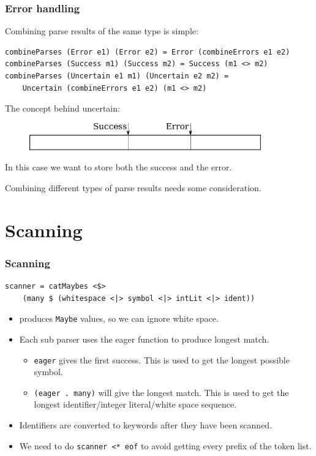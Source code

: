 \documentclass{beamer}
\begin{document}
\begin{frame}[fragile]

\frametitle{Error handling}

Combining parse results of the same type is simple:

\begin{lstlisting}
combineParses (Error e1) (Error e2) = Error (combineErrors e1 e2)
combineParses (Success m1) (Success m2) = Success (m1 <> m2)
combineParses (Uncertain e1 m1) (Uncertain e2 m2) =
    Uncertain (combineErrors e1 e2) (m1 <> m2)
\end{lstlisting}

\pause

The concept behind uncertain:
\begin{figure}
\includegraphics[width=10cm]{drawing}
\end{figure}
In this case we want to store both the success and the error.

Combining different types of parse results needs some consideration.


\end{frame}

\section{Scanning}
\begin{frame}[fragile]
\frametitle{Scanning}

\begin{lstlisting}
scanner = catMaybes <$> 
    (many $ (whitespace <|> symbol <|> intLit <|> ident)) 
\end{lstlisting}

\pause

\begin{itemize}[<+->]
\item produces \lstinline{Maybe} values, so we can ignore white space.
\item Each sub parser uses the eager function to produce longest match.
    \begin{itemize}
    \item \lstinline{eager} gives the first success. This is used to get the longest possible symbol.
    \item \lstinline{(eager . many)} will give the longest match. This is used to get the longest identifier/integer literal/white space sequence.
    \end{itemize}
\item Identifiers are converted to keywords after they have been scanned.
\item We need to do \lstinline{scanner <* eof} to avoid getting every prefix of the token list.
\end{itemize}
\end{frame}
\end{document}

